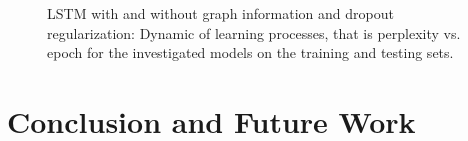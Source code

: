 \documentclass{article} %
\begin{document}
\begin{figure}[h!]
	\centering
	\hfill
	\caption{LSTM with and without graph information and dropout regularization: Dynamic of learning processes, that is perplexity vs. epoch for the investigated models on the training and testing sets.}
	\label{fig3}
\end{figure}







\section{Conclusion and Future Work}
\end{document}

